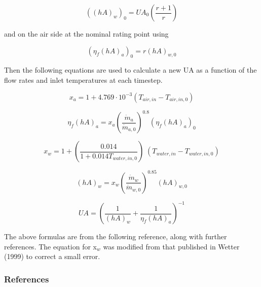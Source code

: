 \begin{equation}
{\left( {{{\left( {hA} \right)}_w}} \right)_0} = U{A_0}\left( {\frac{{r + 1}}{r}} \right)
\end{equation}

and on the air side at the nominal rating point using

\begin{equation}
{\left( {{\eta_f}{{\left( {hA} \right)}_a}} \right)_0} = r{\left( {hA} \right)_{w,0}}
\end{equation}

Then the following equations are used to calculate a new UA as a function of the flow rates and inlet temperatures at each timestep.

\begin{equation}
{x_a} = 1 + 4.769\cdot {10^{ - 3}}\left( {{T_{air,in}} - {T_{air,in,0}}} \right)
\end{equation}

\begin{equation}
{\eta_f}{\left( {hA} \right)_a} = {x_a}{\left( {\frac{{{{\dot m}_a}}}{{{{\dot m}_{a,0}}}}} \right)^{0.8}}{\left( {{\eta_f}{{\left( {hA} \right)}_a}} \right)_0}
\end{equation}

\begin{equation}
{x_w} = 1 + \left( {\frac{{0.014}}{{1 + 0.014{T_{water,in,0}}}}} \right)\;\left( {{T_{water,in}} - {T_{water,in,0}}} \right)
\end{equation}

\begin{equation}
{\left( {hA} \right)_w} = {x_w}{\left( {\frac{{{{\dot m}_w}}}{{{{\dot m}_{w,0}}}}} \right)^{0.85}}{\left( {hA} \right)_{w,0}}
\end{equation}

\begin{equation}
UA = {\left( {\frac{1}{{{{\left( {hA} \right)}_w}}} + \frac{1}{{{\eta_f}{{\left( {hA} \right)}_a}}}} \right)^{ - 1}}
\end{equation}

The above formulas are from the following reference, along with further references. The equation for x\(_{w}\) was modified from that published in Wetter (1999) to correct a small error.

\subsubsection{References}\label{references-1-004}

